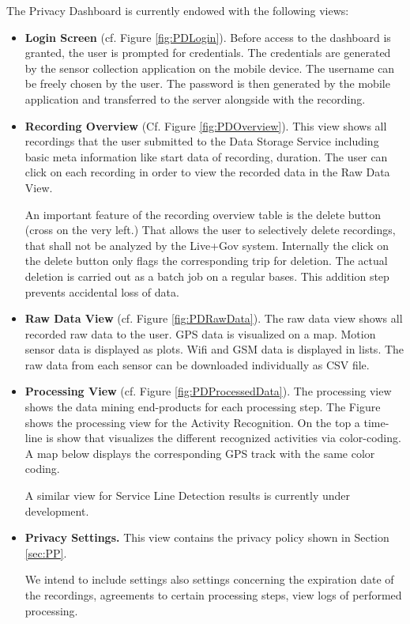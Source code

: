 The Privacy Dashboard is currently endowed with the following views:
\begin{itemize}
  \item \textbf{Login Screen} (cf. Figure \ref{fig:PDLogin}).  Before
    access to the dashboard is granted, the user is prompted for
    credentials.  The credentials are generated by the sensor
    collection application on the mobile device.  The username can be
    freely chosen by the user. The password is then generated by the
    mobile application and transferred to the server alongside with
    the recording.

 \item \textbf{Recording Overview} (Cf. Figure \ref{fig:PDOverview}).
   This view shows all recordings that the user submitted to the Data
   Storage Service including basic meta information like start data of
   recording, duration. The user can click on each recording in order
   to view the recorded data in the Raw Data View.

   An important feature of the recording overview table is the delete
   button (cross on the very left.) That allows the user to
   selectively delete recordings, that shall not be analyzed by the
   Live+Gov system. Internally the click on the delete button only
   flags the corresponding trip for deletion. The actual deletion is
   carried out as a batch job on a regular bases. This addition step
   prevents accidental loss of data.

 \item \textbf{Raw Data View} (cf. Figure \ref{fig:PDRawData}).
   The raw data view shows all recorded raw data to the user.  GPS
   data is visualized on a map. Motion sensor data is displayed as
   plots. Wifi and GSM data is displayed in lists.  The raw data from
   each sensor can be downloaded individually as CSV file.

 \item \textbf{Processing View} (cf. Figure \ref{fig:PDProcessedData}).
   The processing view shows the data mining end-products for each
   processing step.  The Figure shows the processing view for the
   Activity Recognition. On the top a time-line is show that
   visualizes the different recognized activities via color-coding. A
   map below displays the corresponding GPS track with the same color
   coding.

   A similar view for Service Line Detection results is currently
   under development.
 \item \textbf{Privacy Settings.}
   This view contains the privacy policy shown in Section \ref{sec:PP}.

   We intend to include settings also settings concerning the
   expiration date of the recordings, agreements to certain processing
   steps, view logs of performed processing.
\end{itemize}

